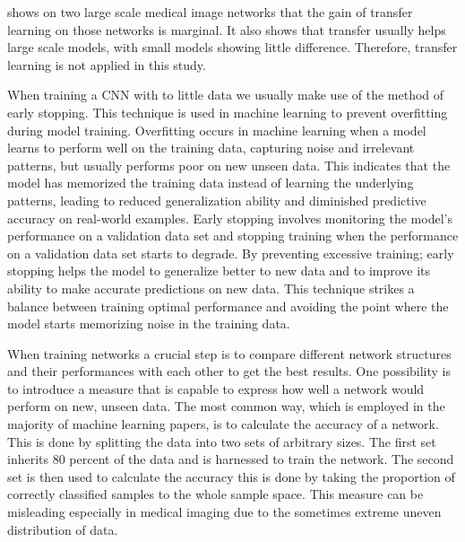 \documentclass[
a4paper, 
12pt,
grayscalebody, %
abstract=on,
twoside, BCOR10mm, 12pt, DIV13,headinclude, footexclude, final, abstracton, openright
]{ibireprt}
\numberwithin{equation}{chapter}
\numberwithin{table}{chapter}
\numberwithin{figure}{chapter}
\numberwithin{algorithm}{chapter}
\numberwithin{example}{chapter}
\numberwithin{example}{chapter}
\begin{document}
\cite{Raghu2019} shows on two large scale medical image networks that the gain of transfer learning on those networks is marginal. It also shows that transfer usually helps large scale models, with small models showing little difference. Therefore, transfer learning is not applied in this study.


When training a CNN with to little data we usually make use of the method of early stopping. This technique is used in machine learning to prevent overfitting during model training. Overfitting occurs in machine learning when a model learns to perform well on the training data, capturing noise and irrelevant patterns, but usually performs poor on new unseen data. This indicates that the model has memorized the training data instead of learning the underlying patterns, leading to reduced generalization ability and diminished predictive accuracy on real-world examples. Early stopping involves monitoring the model's performance on a validation data set and stopping training when the performance on a validation data set starts to degrade. By preventing excessive training; early stopping helps the model to generalize better to new data and to improve its ability to make accurate predictions on new data.
This technique strikes a balance between training optimal performance and avoiding the point where the model starts memorizing noise in the training data. %




When training networks a crucial step is to compare different network structures and their performances with each other to get the best results. One possibility is to introduce a measure that is capable to express how well a network would perform on new, unseen data. The most common way, which is employed in the majority of machine learning papers, is to calculate the accuracy of a network. This is done by splitting the data into two sets of arbitrary sizes. The first set inherits 80 percent of the data and is harnessed to train the network. The second set is then used to calculate the accuracy this is done by taking the proportion of correctly classified samples to the whole sample space. This measure can be misleading especially in medical imaging due to the sometimes extreme uneven distribution of data. 
\end{document}

